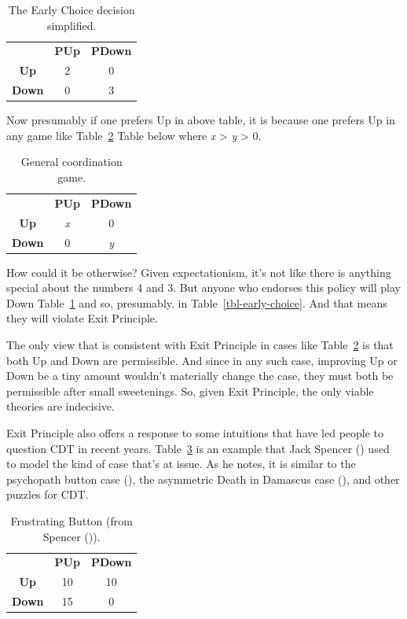 \documentclass[
  12pt,
  letterpaper,
  DIV=11,
  numbers=noendperiod]{scrreprt}
\begin{document}
\begin{longtable}[]{@{}ccc@{}}
\caption{The Early Choice decision
simplified.}\label{tbl-early-choice-simplified}\tabularnewline
\toprule\noalign{}
\endfirsthead
\endhead
\bottomrule\noalign{}
\endlastfoot
& \textbf{PUp} & \textbf{PDown} \\
\textbf{Up} & 2 & 0 \\
\textbf{Down} & 0 & 3 \\
\end{longtable}

Now presumably if one prefers Up in above table, it is because one
prefers Up in any game like Table~\ref{tbl-general-coord} Table below
where \emph{x} \textgreater{} \emph{y} \textgreater{} 0.

\begin{longtable}[]{@{}ccc@{}}
\caption{General coordination
game.}\label{tbl-general-coord}\tabularnewline
\toprule\noalign{}
\endfirsthead
\endhead
\bottomrule\noalign{}
\endlastfoot
& \textbf{PUp} & \textbf{PDown} \\
\textbf{Up} & \emph{x} & 0 \\
\textbf{Down} & 0 & \emph{y} \\
\end{longtable}

How could it be otherwise? Given expectationism, it's not like there is
anything special about the numbers 4 and 3. But anyone who endorses this
policy will play Down Table~\ref{tbl-early-choice-simplified} and so,
presumably, in Table~\ref{tbl-early-choice}. And that means they will
violate Exit Principle.

The only view that is consistent with Exit Principle in cases like
Table~\ref{tbl-general-coord} is that both Up and Down are permissible.
And since in any such case, improving Up or Down be a tiny amount
wouldn't materially change the case, they must both be permissible after
small sweetenings. So, given Exit Principle, the only viable theories
are indecisive.

Exit Principle also offers a response to some intuitions that have led
people to question CDT in recent years.
Table~\ref{tbl-frustrating-button} is an example that Jack Spencer
() used to model the kind of case that's
at issue. As he notes, it is similar to the psychopath button case
(), the asymmetric Death in
Damascus case (), and other
puzzles for CDT.

\begin{longtable}[]{@{}ccc@{}}
\caption{Frustrating Button (from Spencer
()).}\label{tbl-frustrating-button}\tabularnewline
\toprule\noalign{}
\endfirsthead
\endhead
\bottomrule\noalign{}
\endlastfoot
& \textbf{PUp} & \textbf{PDown} \\
\textbf{Up} & 10 & 10 \\
\textbf{Down} & 15 & 0 \\
\end{longtable}
\end{document}
